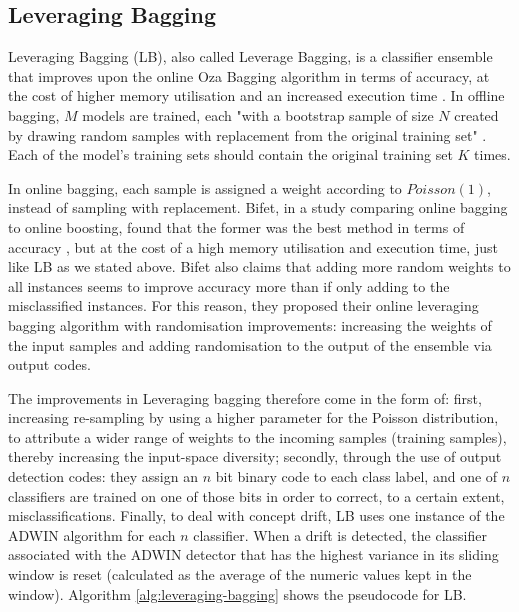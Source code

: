 \subsection{Leveraging Bagging\label{section:leveraging-bagging}}
Leveraging Bagging (LB), also called Leverage Bagging, is a classifier ensemble that improves upon the online Oza Bagging algorithm in terms of accuracy, at the cost of higher memory utilisation and an increased execution time \cite{bifet2010leveraging}. In offline bagging, $M$ models are trained, each "with a bootstrap sample of size $N$ created by drawing random samples with replacement from the original training set" \cite{bifet2010leveraging}. Each of the model's training sets should contain the original training set $K$ times.

In online bagging, each sample is assigned a weight according to $Poisson(1)$, instead of sampling with replacement. Bifet, in a study comparing online bagging to online boosting, found that the former was the best method in terms of accuracy \cite{bifet2009new}, but at the cost of a high memory utilisation and execution time, just like LB as we stated above. Bifet also claims that adding more random weights to all instances seems to improve accuracy more than if only adding to the misclassified instances. For this reason, they proposed their online leveraging bagging algorithm with randomisation improvements: increasing the weights of the input samples and adding randomisation to the output of the ensemble via output codes.

The improvements in Leveraging bagging \cite{bifet2010leveraging} therefore come in the form of: first, increasing re-sampling by using a higher parameter for the Poisson distribution, to attribute a wider range of weights to the incoming samples (training samples), thereby increasing the input-space diversity; secondly, through the use of output detection codes: they assign an $n$ bit binary code to each class label, and one of $n$ classifiers are trained on one of those bits in order to correct, to a certain extent, misclassifications. Finally, to deal with concept drift, LB uses one instance of the ADWIN algorithm for each $n$ classifier. When a drift is detected, the classifier associated with the ADWIN detector that has the highest variance in its sliding window is reset (calculated as the average of the numeric values kept in the window). Algorithm \ref{alg:leveraging-bagging} shows the pseudocode for LB.


